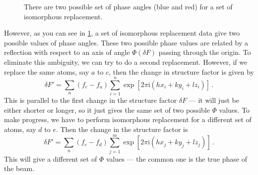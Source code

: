 \documentclass{article}
\theoremstyle{plain}\theoremheaderfont{\normalfont\itshape}\theorembodyfont{\rmfamily}\theoremseparator{.}\newtheorem*{rem}{Remark}\newtheorem*{ex}{Example}\newtheorem*{proof}{Proof}\newtheorem*{altp}{Alternative proof}
\theoremstyle{plain}\theoremheaderfont{\normalfont\bfseries}\theorembodyfont{\rmfamily}\theoremseparator{.}\newtheorem{thm}{Theorem}[section]\newtheorem{lem}[thm]{Lemma}\newtheorem{prop}[thm]{Proposition}\newtheorem*{cor}{Corollary}\newtheorem{defn}[thm]{Definition}\newtheorem{clm}[thm]{Claim}\newtheorem{clminproof}{Claim}\newtheorem*{law}{Law}\newtheorem{pos}[thm]{Postulate}
\theoremstyle{break}\theoremheaderfont{\normalfont\itshape}\theorembodyfont{\rmfamily}\theoremseparator{.\medskip}\newtheorem*{proofskip}{Proof}\newtheorem*{exs}{Examples}\newtheorem*{rems}{Remarks}
\theoremstyle{break}\theoremheaderfont{\normalfont\bfseries}\theorembodyfont{\rmfamily}\theoremseparator{.\medskip}\newtheorem{lemskip}[thm]{Lemma}\newtheorem{defnskip}[thm]{Definition}\newtheorem{propskip}[thm]{Proposition}\newtheorem{thmskip}[thm]{Theorem}
\numberwithin{equation}{section}
\newcommand{\ii}{\mathrm{i}}
\begin{document}
    \begin{figure}[ht!]
        \centering
        \caption{There are two possible set of phase angles (blue and red) for a set of isomorphous replacement.}
        \label{Fig:isomorphous_replacement}
    \end{figure}

    However, as you can see in \cref{Fig:isomorphous_replacement}, a set of isomorphous replacement data give two possible values of phase angles. These two possible phase values are related by a reflection with respect to an axis of angle \(\Phi(\delta F)\) passing through the origin. To eliminate this ambiguity, we can try to do a second replacement. However, if we replace the same atoms, say \(a\) to \(c\), then the change in structure factor is given by
    \begin{equation}
        \delta F'=\sum_n (f_c-f_a)\sum_{i=1}^{n}\exp[2\pi \ii(hx_i+ky_i+lz_i)]\,.
    \end{equation}
    This is parallel to the first change in the structure factor \(\delta F\) --- it will just be either shorter or longer, so it just gives the same set of two possible \(\Phi\) values. To make progress, we have to perform isomorphous replacement for a different set of atoms, say \(d\) to \(e\). Then the change in the structure factor is
    \begin{equation}
        \delta F'=\sum_n (f_e-f_d)\sum_{j=1}^{m}\exp[2\pi \ii(hx_j+ky_j+lz_j)]\,.
    \end{equation}
    This will give a different set of \(\Phi\) values --- the common one is the true phase of the beam.
\end{document}

